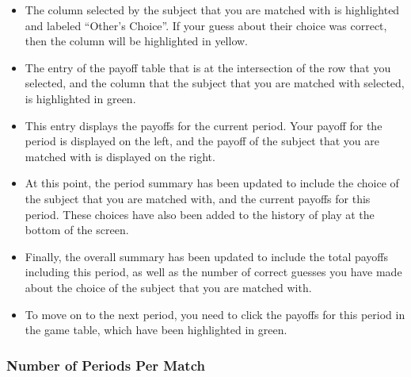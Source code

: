 \documentclass[11pt]{article}
\newcommand{\dblbkt}[1]{}
\begin{document}
\begin{itemize}
\begin{itemize}
\item \dblbkt{1} The column selected by the subject that you are matched with is highlighted and labeled ``Other's Choice''.  If your guess about their choice was correct, then the column will be highlighted in yellow.
\item \dblbkt{1} The entry of the payoff table that is at the intersection of the row that you selected, and the column that the subject that you are matched with selected, is highlighted in green.   
\item This entry displays the payoffs for the current period.  Your payoff for the period is displayed on the left, and the payoff of the subject that you are matched with is displayed on the right.  
\item At this point, the period summary has been updated to include \dblbkt{1} the choice of the subject that you are matched with, \dblbkt{1} and the current payoffs for this period.  These choices have also been added to the \dblbkt{1} history of play at the bottom of the screen.  
\item  Finally, \dblbkt{1} the overall summary has been updated to include \dblbkt{1} the total payoffs including this period, as well as \dblbkt{1} the number of correct guesses you have made about the choice of the subject that you are matched with.
\item \dblbkt{1} To move on to the next period, you need to click the payoffs for this period in the game table, which have been highlighted in  \dblbkt{1} green. \dblbkt{slnc 3000} 
\end{itemize} 
\end{itemize}

\subsubsection*{\dblbkt{4}Number of Periods Per Match} 
\end{document}
